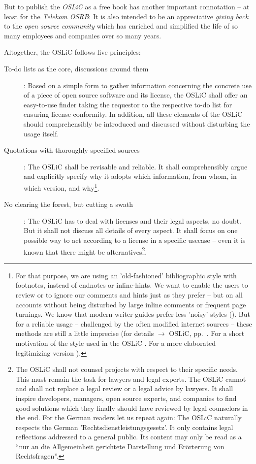 But to publish the \emph{OSLiC} as a free book has another important connotation --
at least for the \emph{Telekom OSRB}: It is also intended to be an appreciative
\emph{giving back} to the \emph{open source community} which has enriched and
simplified the life of so many employees and companies over so many years.

Altogether, the OSLiC follows five principles:

\begin{description}
  \item[To-do lists as the core, discussions around them]: Based on a simple
  form to gather information concerning the concrete use of a piece of open
  source software and its license, the OSLiC shall offer an easy-to-use finder
  taking the requestor to the respective to-do list for ensuring license
  conformity. In addition, all these elements of the OSLiC should comprehensibly
  be introduced and discussed without disturbing the usage itself.

  \item[Quotations with thoroughly specified sources]\label{QuotationPrinciple}:
  The OSLiC shall be revisable and reliable. It shall comprehensibly argue and
  explicitly specify why it adopts which information, from whom, in which
  version, and why\footnote{For that purpose, we are using an 'old-fashioned'
  bibliographic style with footnotes, instead of endnotes or inline-hints.
  We want to enable the users to review or to ignore our comments and hints just
  as they prefer -- but on all accounts without being disturbed by large inline
  comments or frequent page turnings. We know that modern writer guides prefer
  less 'noisy' styles (\cite[pars pro toto cf.][\nopage passim]{Mla2009a}). But
  for a reliable usage -- challenged by the often modified internet sources --
  these methods are still a little imprecise (for details $\rightarrow$ OSLiC,
  pp.\ \pageref{sec:QuotationAppendix}. For a short motivation of the style used
  in the OSLiC \cite[cf.][\nopage passim]{Reincke2012a}. For a more elaborated
  legitimizing version \cite[cf.][\nopage passim]{Reincke2012b}).}.

  \item[No clearing the forest, but cutting a swath]: The OSLiC has to deal with
  licenses and their legal aspects, no doubt. But it shall not discuss all
  details of every aspect. It shall focus on one possible way to act according
  to a license in a specific usecase -- even it is known that there might be
  alternatives\footnote{The OSLiC shall not counsel projects with respect to
  their specific needs. This must remain the task for lawyers and legal experts.
  The OSLiC cannot and shall not replace a legal review or a legal advice by
  lawyers. It shall inspire developers, managers, open source experts, and
  companies to find good solutions which they finally should have reviewed by
  legal counselors in the end. For the German readers let us repeat again: The
  OSLiC naturally respects the German 'Rechtsdienstleistungsgesetz'. It only
  contains legal reflections addressed to a general public. Its content may only
  be read as a \enquote{nur an die Allgemeinheit gerichtete Darstellung und
  Erörterung von Rechtsfragen}.}.
  

\end{description}

